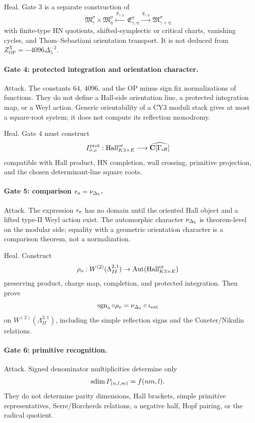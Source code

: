 Heal.  Gate 3 is a separate construction of
\[
\mathfrak M_\gamma^\sigma\times\mathfrak M_\eta^\sigma
\xleftarrow{\ p_{\gamma,\eta}\ }
\mathfrak E_{\gamma,\eta}^\sigma
\xrightarrow{\ q_{\gamma,\eta}\ }
\mathfrak M_{\gamma+\eta}^\sigma
\]
with finite-type HN quotients, shifted-symplectic or critical charts,
vanishing cycles, and Thom--Sebastiani orientation transport.  It is not
deduced from \(Z^{X}_{\operatorname{OP}}=-4096\Delta_5^{-2}\).

\paragraph{Gate 4: protected integration and orientation character.}
Attack.  The constants \(64\), \(4096\), and the OP minus sign fix
normalizations of functions.  They do not define a Hall-side orientation
line, a protected integration map, or a Weyl action.  Generic orientability
of a CY3 moduli stack gives at most a square-root system; it does not
compute its reflection monodromy.

Heal.  Gate 4 must construct
\[
I^{\operatorname{prot}}_{\sigma,o}:
\operatorname{Hall}^{\operatorname{or}}_{K3\times E}
\longrightarrow
\widehat{\mathbf C[\Gamma_{\operatorname{eff}}]}
\]
compatible with Hall product, HN completion, wall crossing, primitive
projection, and the chosen determinant-line square roots.

\paragraph{Gate 5: comparison \(\epsilon_o=\nu_{\Delta_5}\).}
Attack.  The expression \(\epsilon_o\) has no domain until the oriented Hall
object and a lifted type-II Weyl action exist.  The automorphic character
\(\nu_{\Delta_5}\) is theorem-level on the modular side; equality with a geometric
orientation character is a comparison theorem, not a normalization.

Heal.  Construct
\[
\rho_o:W^{(2)}(\Lambda^{2,1}_{II})
\to
\operatorname{Aut}(\operatorname{Hall}^{\operatorname{or}}_{K3\times E})
\]
preserving product, charge map, completion, and protected integration.
Then prove
\[
        \operatorname{sgn}_o\circ\rho_o
        =
        \nu_{\Delta_5}\circ\iota_{\operatorname{ext}}
\]
on \(W^{(2)}(\Lambda^{2,1}_{II})\), including the simple reflection signs
and the Coxeter/Nikulin relations.

\paragraph{Gate 6: primitive recognition.}
Attack.  Signed denominator multiplicities determine only
\[
        \operatorname{sdim} P_{(n,l,m)}=f(nm,l).
\]
They do not determine parity dimensions, Hall brackets, simple primitive
representatives, Serre/Borcherds relations, a negative half, Hopf pairing,
or the radical quotient.

